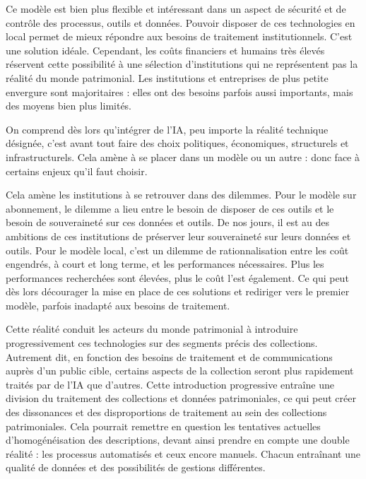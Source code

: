 Ce modèle est bien plus flexible et intéressant dans un aspect de sécurité et de contrôle des processus, outils et données. Pouvoir disposer de ces technologies en local permet de mieux répondre aux besoins de traitement institutionnels. C'est une solution idéale. Cependant, les coûts financiers et humains très élevés réservent cette possibilité à une sélection d'institutions qui ne représentent pas la réalité du monde patrimonial. Les institutions et entreprises de plus petite envergure sont majoritaires : elles ont des besoins parfois aussi importants, mais des moyens bien plus limités.\newline
 
On comprend dès lors qu'intégrer de l'\gls{IA}, peu importe la réalité technique désignée, c'est avant tout faire des choix politiques, économiques, structurels et infrastructurels. Cela amène à se placer dans un modèle ou un autre : donc face à certains enjeux qu'il faut choisir. 
 
Cela amène les institutions à se retrouver dans des dilemmes. Pour le modèle sur abonnement, le dilemme a lieu entre le besoin de disposer de ces outils et le besoin de souveraineté sur ces données et outils. De nos jours, il est au \coeur des ambitions de ces institutions de préserver leur souveraineté sur leurs données et outils. Pour le modèle local, c'est un dilemme de rationnalisation entre les coût engendrés, à court et long terme, et les performances nécessaires. Plus les performances recherchées sont élevées, plus le coût l'est également. Ce qui peut dès lors décourager la mise en place de ces solutions et rediriger vers le premier modèle, parfois inadapté aux besoins de traitement. 
 
Cette réalité conduit les acteurs du monde patrimonial à introduire progressivement ces technologies sur des segments précis des collections. Autrement dit, en fonction des besoins de traitement et de communications auprès d'un public cible, certains aspects de la collection seront plus rapidement traités par de l'\gls{IA} que d'autres. Cette introduction progressive entraîne une division du traitement des collections et données patrimoniales, ce qui peut créer  des dissonances et des disproportions de traitement au sein des collections patrimoniales. Cela pourrait remettre en question les tentatives actuelles d'homogénéisation des descriptions, devant ainsi prendre en compte une double réalité : les processus automatisés et ceux encore manuels. Chacun entraînant une qualité de données et des possibilités de gestions différentes.\newline


